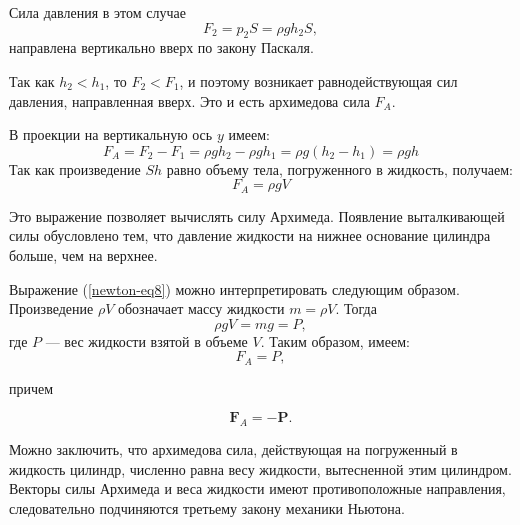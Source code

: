 \documentclass[14pt,a4paper,oneside]{extarticle}	%
\begin{document}
Сила давления в этом случае $$ F_{2} = p_{2}S = \rho gh_{2}S, $$ 
направлена вертикально вверх по закону Паскаля.

Так как $ h_{2} < h_{1} $, то $ F_{2} < F_{1} $, и поэтому возникает равнодействующая сил давления, направленная вверх. 
Это и есть архимедова сила $ F_{A} $. 

В проекции на вертикальную ось $ y $ имеем:
\begin{equation}\label{newton-eq7}
F_{A} = F_{2} - F_{1} = \rho gh_{2} - \rho gh_{1} = \rho g(h_{2} - h_{1}) = \rho gh
\end{equation} 
Так как произведение $ Sh $ равно объему тела, погруженного в жидкость, получаем: 
\begin{equation}\label{newton-eq8}
F_{A} = \rho gV
\end{equation} 

Это выражение позволяет вычислять силу Архимеда.
Появление выталкивающей силы обусловлено тем, что давление жидкости на нижнее основание цилиндра больше, чем на верхнее.

Выражение (\ref{newton-eq8}) можно интерпретировать следующим образом. 
Произведение $ \rho V $ обозначает массу жидкости  $ m = \rho V $. 
Тогда $$\rho g V = mg = P,$$
где $ P $ — вес жидкости взятой в объеме $ V $. 
Таким образом, имеем:
\begin{equation}\label{newton-eq9}
F_{A} = P,
\end{equation} 

причем 

\begin{equation}\label{newton-eq10}
\textbf{F}_{A} = -\textbf{P}.
\end{equation} 

Можно заключить, что архимедова сила, действующая на погруженный в жидкость цилиндр, численно равна весу жидкости, вытесненной этим цилиндром.
Векторы силы Архимеда и веса жидкости имеют противоположные направления, следовательно подчиняются третьему закону механики Ньютона.
\end{document}
